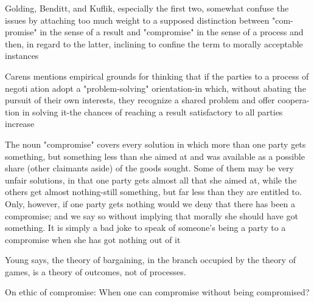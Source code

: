 \cite{Braybrooke1982}
Golding, Benditt, and Kuflik, especially the first two, somewhat confuse the
issues by attaching too much weight to a supposed distinction between "com-
promise" in the sense of a result and "compromise" in the sense of a process and
then, in regard to the latter, inclining to confine the term to morally acceptable
instances

Carens mentions empirical grounds for thinking that if the parties to a process of negoti
ation adopt a "problem-solving" orientation-in which, without abating the
pursuit of their own interests, they recognize a shared problem and offer coopera-
 tion in solving it-the chances of reaching a result satisfactory to all parties
increase

 The noun "compromise" covers every solution in which more than one party
gets something, but something less than she aimed at and was available as a
possible share (other claimants aside) of the goods sought. Some of them may be
very unfair solutions, in that one party gets almost all that she aimed at, while the
others get almost nothing-still something, but far less than they are entitled to.
Only, however, if one party gets nothing would we deny that there has been a
compromise; and we say so without implying that morally she should have got
something. It is simply a bad joke to speak of someone's being a party to a
compromise when she has got nothing out of it

 Young says, the theory of bargaining, in the branch occupied by the theory of
games, is a theory of outcomes, not of processes.



On ethic of compromise: When one can compromise without being compromised?
